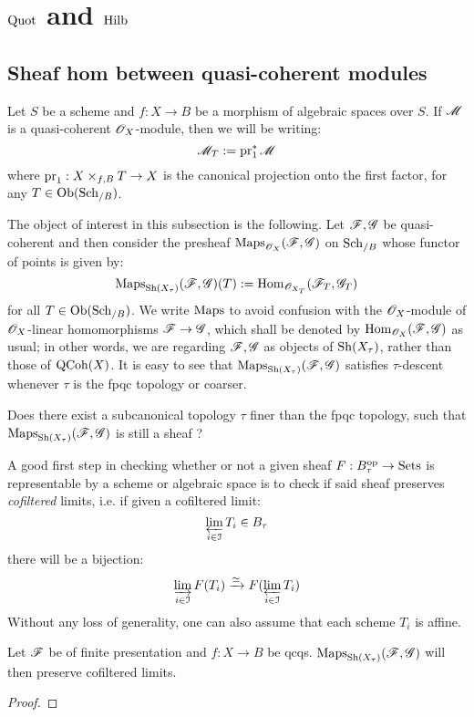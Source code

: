 \section{\texorpdfstring{$\mathrm{Quot}$ and $\mathrm{Hilb}$}{}}
    \subsection{Sheaf hom between quasi-coherent modules}
        \begin{convention}
            Let $S$ be a scheme and $f: X \to B$ be a morphism of algebraic spaces over $S$. If $\mathscr{M}$ is a quasi-coherent $\mathscr{O}_X$-module, then we will be writing:
                $$\mathscr{M}_T := \operatorname{pr}_1^*\mathscr{M}$$
            where $\pr_1: X \x_{f, B} T \to X$ is the canonical projection onto the first factor, for any $T \in \mathrm{Ob}( \mathrm{Sch}_{/B} )$.
        \end{convention}

        The object of interest in this subsection is the following. Let $\mathscr{F}, \mathscr{G}$ be quasi-coherent and then consider the presheaf $\mathrm{Maps}_{\mathscr{O}_X}(\mathscr{F}, \mathscr{G})$ on $\mathrm{Sch}_{/B}$ whose functor of points is given by:
            $$\mathrm{Maps}_{\mathrm{Sh}(X_{\tau})}(\mathscr{F}, \mathscr{G})(T) := \mathrm{Hom}_{\mathscr{O}_{X_T}}(\mathscr{F}_T, \mathscr{G}_T)$$
        for all $T \in \mathrm{Ob}(\mathrm{Sch}_{/B})$. We write $\mathrm{Maps}$ to avoid confusion with the $\mathscr{O}_X$-module of $\mathscr{O}_X$-linear homomorphisms $\mathscr{F} \to \mathscr{G}$, which shall be denoted by $\mathrm{Hom}_{\mathscr{O}_X}(\mathscr{F}, \mathscr{G})$ as usual; in other words, we are regarding $\mathscr{F}, \mathscr{G}$ as objects of $\mathrm{Sh}(X_{\tau})$, rather than those of $\mathrm{QCoh}(X)$. It is easy to see that $\mathrm{Maps}_{\mathrm{Sh}(X_{\tau})}(\mathscr{F}, \mathscr{G})$ satisfies $\tau$-descent whenever $\tau$ is the fpqc topology or coarser.

        \begin{question}
            Does there exist a subcanonical topology $\tau$ finer than the fpqc topology, such that $\mathrm{Maps}_{\mathrm{Sh}(X_{\tau})}(\mathscr{F}, \mathscr{G})$ is still a sheaf ?
        \end{question}

        A good first step in checking whether or not a given sheaf $F: B_{\tau}^{\mathrm{op}} \to \mathrm{Sets}$ is representable by a scheme or algebraic space is to check if said sheaf preserves \textit{cofiltered} limits, i.e. if given a cofiltered limit:
            $$\varprojlim_{i \in \mathcal{I}} T_i \in B_{\tau}$$
        there will be a bijection:
            $$\varinjlim_{i \in \mathcal{I}} F(T_i) \xrightarrow[]{\simeq} F( \varprojlim_{i \in \mathcal{I}} T_i )$$
        Without any loss of generality, one can also assume that each scheme $T_i$ is affine.
        \begin{lemma}
            Let $\mathscr{F}$ be of finite presentation and $f: X \to B$ be qcqs. $\mathrm{Maps}_{\mathrm{Sh}(X_{\tau})}(\mathscr{F}, \mathscr{G})$ will then preserve cofiltered limits.
        \end{lemma}
            \begin{proof}
                
            \end{proof}

